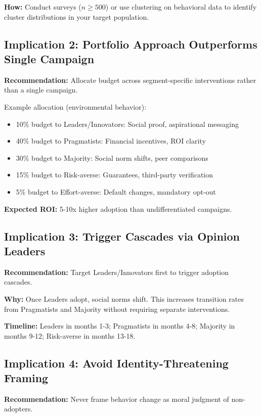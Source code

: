 \textbf{How:} Conduct surveys ($n \geq 500$) or use clustering on behavioral data
to identify cluster distributions in your target population.

\subsection{Implication 2: Portfolio Approach Outperforms Single Campaign}

\textbf{Recommendation:} Allocate budget across segment-specific interventions rather
than a single campaign.

Example allocation (environmental behavior):
\begin{itemize}[nosep]
    \item 10\% budget to Leaders/Innovators: Social proof, aspirational messaging
    \item 40\% budget to Pragmatists: Financial incentives, ROI clarity
    \item 30\% budget to Majority: Social norm shifts, peer comparisons
    \item 15\% budget to Risk-averse: Guarantees, third-party verification
    \item 5\% budget to Effort-averse: Default changes, mandatory opt-out
\end{itemize}

\textbf{Expected ROI:} 5-10x higher adoption than undifferentiated campaigns.

\subsection{Implication 3: Trigger Cascades via Opinion Leaders}

\textbf{Recommendation:} Target Leaders/Innovators first to trigger adoption cascades.

\textbf{Why:} Once Leaders adopt, social norms shift. This increases transition rates
from Pragmatists and Majority without requiring separate interventions.

\textbf{Timeline:} Leaders in months 1-3; Pragmatists in months 4-8; Majority in
months 9-12; Risk-averse in months 13-18.

\subsection{Implication 4: Avoid Identity-Threatening Framing}

\textbf{Recommendation:} Never frame behavior change as moral judgment of non-adopters.

